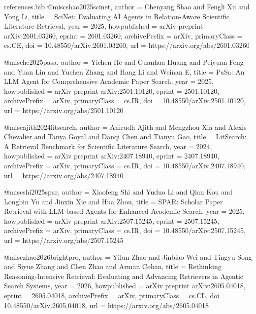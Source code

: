 \begin{filecontents*}{references.bib}
@misc{shao2025scinet,
  author        = {Chenyang Shao and Fengli Xu and Yong Li},
  title         = {{SciNet: Evaluating AI Agents in Relation-Aware Scientific Literature Retrieval}},
  year          = {2025},
  howpublished  = {arXiv preprint arXiv:2601.03260},
  eprint        = {2601.03260},
  archivePrefix = {arXiv},
  primaryClass  = {cs.CE},
  doi           = {10.48550/arXiv.2601.03260},
  url           = {https://arxiv.org/abs/2601.03260}
}

@misc{he2025pasa,
  author        = {Yichen He and Guanhua Huang and Peiyuan Feng and Yuan Lin and Yuchen Zhang and Hang Li and Weinan E},
  title         = {{PaSa: An LLM Agent for Comprehensive Academic Paper Search}},
  year          = {2025},
  howpublished  = {arXiv preprint arXiv:2501.10120},
  eprint        = {2501.10120},
  archivePrefix = {arXiv},
  primaryClass  = {cs.IR},
  doi           = {10.48550/arXiv.2501.10120},
  url           = {https://arxiv.org/abs/2501.10120}
}

@misc{ajith2024litsearch,
  author        = {Anirudh Ajith and Mengzhou Xia and Alexis Chevalier and Tanya Goyal and Danqi Chen and Tianyu Gao},
  title         = {{LitSearch: A Retrieval Benchmark for Scientific Literature Search}},
  year          = {2024},
  howpublished  = {arXiv preprint arXiv:2407.18940},
  eprint        = {2407.18940},
  archivePrefix = {arXiv},
  primaryClass  = {cs.IR},
  doi           = {10.48550/arXiv.2407.18940},
  url           = {https://arxiv.org/abs/2407.18940}
}

@misc{shi2025spar,
  author        = {Xiaofeng Shi and Yuduo Li and Qian Kou and Longbin Yu and Jinxin Xie and Hua Zhou},
  title         = {{SPAR: Scholar Paper Retrieval with LLM-based Agents for Enhanced Academic Search}},
  year          = {2025},
  howpublished  = {arXiv preprint arXiv:2507.15245},
  eprint        = {2507.15245},
  archivePrefix = {arXiv},
  primaryClass  = {cs.IR},
  doi           = {10.48550/arXiv.2507.15245},
  url           = {https://arxiv.org/abs/2507.15245}
}

@misc{zhao2026brightpro,
  author        = {Yilun Zhao and Jinbiao Wei and Tingyu Song and Siyue Zhang and Chen Zhao and Arman Cohan},
  title         = {{Rethinking Reasoning-Intensive Retrieval: Evaluating and Advancing Retrievers in Agentic Search Systems}},
  year          = {2026},
  howpublished  = {arXiv preprint arXiv:2605.04018},
  eprint        = {2605.04018},
  archivePrefix = {arXiv},
  primaryClass  = {cs.CL},
  doi           = {10.48550/arXiv.2605.04018},
  url           = {https://arxiv.org/abs/2605.04018}
}



\end{filecontents*}
